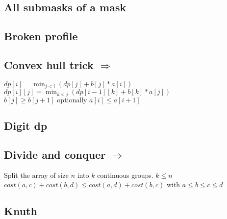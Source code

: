 
\subsection{All submasks of a mask }


\subsection{Broken profile }


\subsection{Convex hull trick  $\Rightarrow$ }

$ dp[i] = \min_{j < i}(dp[j] + b[j] * a[i]) $ \\
$ dp[i][j] = \min_{k < j}(dp[i - 1][k] + b[k] * a[j]) $ \\
$ b[j] \geq b[j + 1] \text{ optionally } a[i] \leq a[i + 1] $ \\ 

\subsection{Digit dp }


\subsection{Divide and conquer  $\Rightarrow$ }

Split the array of size $n$ into $k$ continuous groups. $k \leq n$ \\
$ cost(a, c) + cost(b, d) \leq cost(a, d) + cost(b, c)$ with $a \leq b \leq c \leq d$ \\

\subsection{Knuth }


